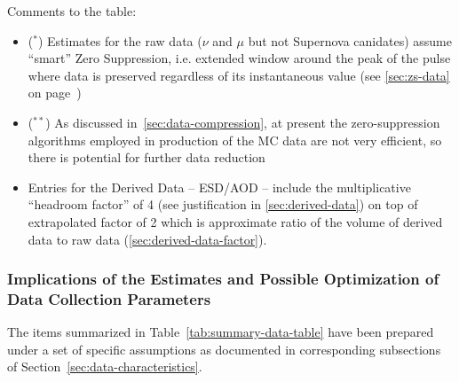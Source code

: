 Comments to the table:
\begin{itemize}
\item ($^*$) Estimates for the raw data ($\nu$ and $\mu$ but not Supernova canidates) assume ``smart'' Zero Suppression, i.e. extended
window around the peak of the pulse where data is preserved regardless of its instantaneous value (see \ref{sec:zs-data} on page~\pageref{sec:zs-data})

\item ($^{**}$) As discussed in~\ref{sec:data-compression}, at present the zero-suppression algorithms employed in production of the
MC data are not very efficient, so there is potential for further data reduction

\item Entries for the Derived Data -- ESD/AOD --  include the multiplicative ``headroom factor'' of 4 (see justification in \ref{sec:derived-data})
on top of extrapolated factor of 2 which is approximate ratio of the volume of derived data to raw data (\ref{sec:derived-data-factor}).
\end{itemize}

\subsubsection{Implications of the Estimates and Possible Optimization of Data Collection Parameters}
\label{sec:implications-of-data-estimates}
The items summarized in Table~\ref{tab:summary-data-table} have been prepared under a set of specific
assumptions as documented in corresponding subsections of Section~\ref{sec:data-characteristics}.

